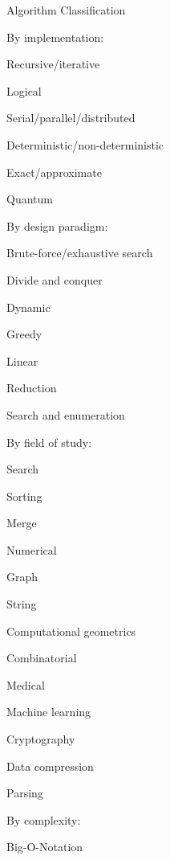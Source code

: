 Algorithm Classification

\begin{multicols}{2}
\begin{itemize}
  {\setlength\itemindent{-26pt} \item[] By implementation:}
  \item Recursive/iterative
  \item Logical
  \item Serial/parallel/distributed
  \item Deterministic/non-deterministic
  \item Exact/approximate
  \item Quantum
\end{itemize}

\begin{itemize}
  {\setlength\itemindent{-26pt} \item[] By design paradigm:}
  \item Brute-force/exhaustive search
  \item Divide and conquer
  \item Dynamic
  \item Greedy
  \item Linear
  \item Reduction
  \item Search and enumeration
\end{itemize}

\begin{itemize}
  {\setlength\itemindent{-26pt} \item[] By field of study:}
  \item Search
  \item Sorting
  \item Merge
  \item Numerical
  \item Graph
  \item String
  \item Computational geometrics
  \item Combinatorial
  \item Medical
  \item Machine learning
  \item Cryptography
  \item Data compression
  \item Parsing
\end{itemize}

\begin{itemize}
  {\setlength\itemindent{-26pt} \item[] By complexity:}
  \item Big-O-Notation
\end{itemize}
\end{multicols}

